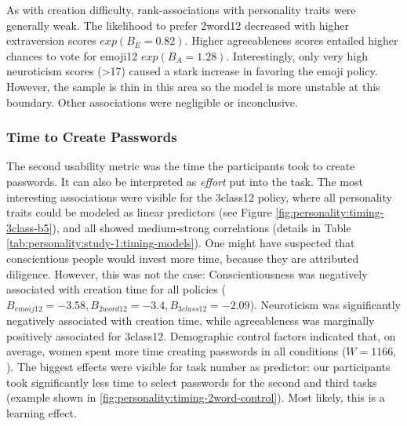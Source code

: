 As with creation difficulty, rank-associations with personality traits were generally weak. The likelihood to prefer 2word12 decreased with higher extraversion scores $exp(B_{E}=0.82)$. Higher agreeableness scores entailed higher chances to vote for emoji12 $exp(B_{A}=1.28)$. Interestingly, only very high neuroticism scores (>17) caused a  stark increase in favoring the emoji policy. However, the sample is thin in this area so the model is more unstable at this boundary. Other associations were negligible or inconclusive. 




\subsubsection{Time to Create Passwords}
The second usability metric was the time the participants took to create passwords. It can also be interpreted as \textit{effort} put into the task. The most interesting associations were visible for the 3class12 policy, where all personality traits could be modeled as linear predictors (see Figure \ref{fig:personality:timing-3class-b5}), and all showed medium-strong correlations (details in Table \ref{tab:personality:study-1:timing-models}). One might have suspected that conscientious people would invest more time, because they are attributed diligence. However, this was not the case: Conscientiousness was negatively associated with creation time for all policies ($B_{emoij12}=-3.58,B_{2word12}=-3.4,B_{3class12}=-2.09$). Neuroticism was significantly negatively associated with creation time, while agreeableness was marginally positively associated for 3class12. Demographic control factors indicated that, on average, women spent more time creating passwords in all conditions ($W=1166$, ). The biggest effects were visible for task number as predictor: our participants took significantly less time to select passwords for the second and third tasks (example shown in \ref{fig:personality:timing-2word-control}). Most likely, this is a learning effect. 


